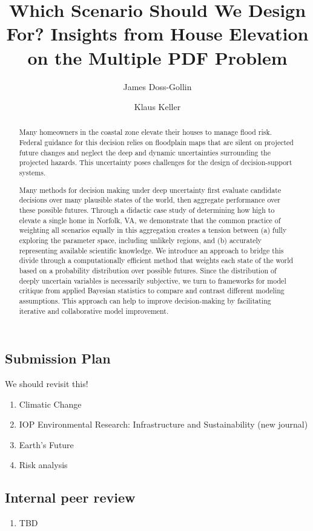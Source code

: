 \documentclass[12pt]{article}
\title{Which Scenario Should We Design For? Insights from House Elevation on the Multiple PDF Problem}
\author[1]{James Doss-Gollin}
\author[2,3,4]{Klaus Keller}
\affil[1]{Department of Civil and Environmental Engineering, Rice University}
\affil[2]{Department of Geosciences, the Pennsylvania State University}
\affil[3]{Earth and Environmental Systems Institute, the Pennsylvania State University}
\affil[4]{Dartmouth?}
\begin{document}
\maketitle
\thispagestyle{empty}

\begin{abstract}
    Many homeowners in the coastal zone elevate their houses to manage flood risk.
    Federal guidance for this decision relies on floodplain maps that are silent on projected future changes and neglect the deep and dynamic uncertainties surrounding the projected hazards.
    This uncertainty poses challenges for the design of decision-support systems.

    Many methods for decision making under deep uncertainty first evaluate candidate decisions over many plausible states of the world, then aggregate performance over these possible futures.
    Through a didactic case study of determining how high to elevate a single home in Norfolk, VA, we demonstrate that the common practice of weighting all scenarios equally in this aggregation creates a tension between (a) fully exploring the parameter space, including unlikely regions, and (b) accurately representing available scientific knowledge.
    We introduce an approach to bridge this divide through a computationally efficient method that weights each state of the world based on a probability distribution over possible futures.
    Since the distribution of deeply uncertain variables is necessarily subjective, we turn to frameworks for model critique from applied Bayesian statistics to compare and contrast different modeling assumptions.
    This approach can help to improve decision-making by facilitating iterative and collaborative model improvement.
\end{abstract}

\subsection*{Submission Plan}
We should revisit this!
\begin{enumerate}
    \item Climatic Change
    \item IOP Environmental Research: Infrastructure and Sustainability (new journal)
    \item Earth's Future
    \item Risk analysis
\end{enumerate}
\subsection*{Internal peer review}
\begin{enumerate}
    \item TBD
\end{enumerate}
\end{document}
